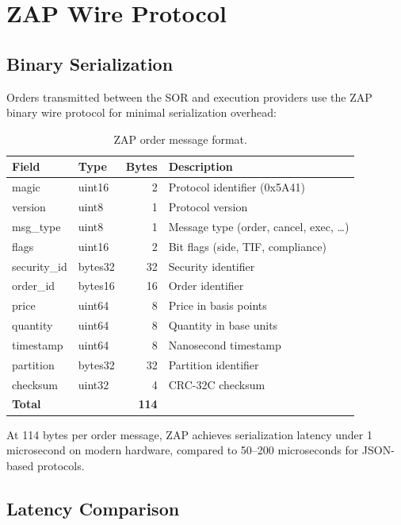 \documentclass[11pt,a4paper]{article}
\begin{document}
\section{ZAP Wire Protocol}\label{sec:zap}

\subsection{Binary Serialization}

Orders transmitted between the SOR and execution providers use the ZAP binary wire protocol \cite{lux-zap-wire-protocol} for minimal serialization overhead:

\begin{table}[H]
\centering
\caption{ZAP order message format.}
\label{tab:zap-format}
\begin{tabular}{llrl}
\toprule
\textbf{Field} & \textbf{Type} & \textbf{Bytes} & \textbf{Description} \\
\midrule
magic & uint16 & 2 & Protocol identifier (0x5A41) \\
version & uint8 & 1 & Protocol version \\
msg\_type & uint8 & 1 & Message type (order, cancel, exec, \ldots) \\
flags & uint16 & 2 & Bit flags (side, TIF, compliance) \\
security\_id & bytes32 & 32 & Security identifier \\
order\_id & bytes16 & 16 & Order identifier \\
price & uint64 & 8 & Price in basis points \\
quantity & uint64 & 8 & Quantity in base units \\
timestamp & uint64 & 8 & Nanosecond timestamp \\
partition & bytes32 & 32 & Partition identifier \\
checksum & uint32 & 4 & CRC-32C checksum \\
\midrule
\multicolumn{2}{l}{\textbf{Total}} & \textbf{114} & \\
\bottomrule
\end{tabular}
\end{table}

At 114 bytes per order message, ZAP achieves serialization latency under 1 microsecond on modern hardware, compared to 50--200 microseconds for JSON-based protocols.

\subsection{Latency Comparison}
\end{document}
